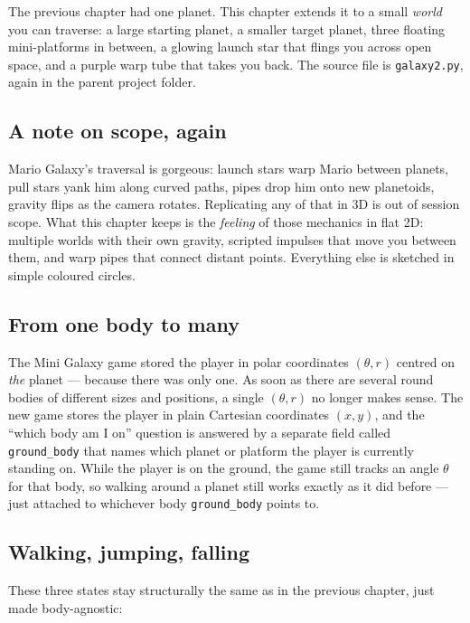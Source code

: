 The previous chapter had one planet. This chapter extends it to a
small \emph{world} you can traverse: a large starting planet, a
smaller target planet, three floating mini-platforms in between, a
glowing launch star that flings you across open space, and a purple
warp tube that takes you back. The source file is \texttt{galaxy2.py},
again in the parent project folder.

\subsection*{A note on scope, again}

Mario Galaxy's traversal is gorgeous: launch stars warp Mario between
planets, pull stars yank him along curved paths, pipes drop him onto
new planetoids, gravity flips as the camera rotates. Replicating any
of that in 3D is out of session scope. What this chapter keeps is the
\emph{feeling} of those mechanics in flat 2D: multiple worlds with
their own gravity, scripted impulses that move you between them, and
warp pipes that connect distant points. Everything else is sketched
in simple coloured circles.

\subsection*{From one body to many}

The Mini Galaxy game stored the player in polar coordinates
$(\theta, r)$ centred on \emph{the} planet --- because there was only
one. As soon as there are several round bodies of different sizes and
positions, a single $(\theta, r)$ no longer makes sense. The new game
stores the player in plain Cartesian coordinates $(x, y)$, and the
``which body am I on'' question is answered by a separate field
called \texttt{ground\_body} that names which planet or platform the
player is currently standing on. While the player is on the ground,
the game still tracks an angle $\theta$ for that body, so walking
around a planet still works exactly as it did before --- just
attached to whichever body \texttt{ground\_body} points to.

\subsection*{Walking, jumping, falling}

These three states stay structurally the same as in the previous
chapter, just made body-agnostic:

